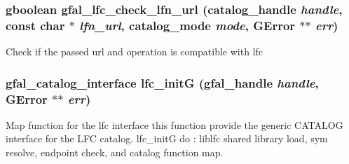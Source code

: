 \subsubsection{\setlength{\rightskip}{0pt plus 5cm}gboolean gfal\_\-lfc\_\-check\_\-lfn\_\-url (catalog\_\-handle {\em handle}, const char $\ast$ {\em lfn\_\-url}, catalog\_\-mode {\em mode}, GError $\ast$$\ast$ {\em err})}\label{gfal__common__lfc_8h_8baa624b528deb15ff4ee61fa9948ac8}


Check if the passed url and operation is compatible with lfc 
\subsubsection{\setlength{\rightskip}{0pt plus 5cm}gfal\_\-catalog\_\-interface lfc\_\-init\-G (gfal\_\-handle {\em handle}, GError $\ast$$\ast$ {\em err})}\label{gfal__common__lfc_8h_0d4af55002fa4216f9915b5a1a721ef4}


Map function for the lfc interface this function provide the generic CATALOG interface for the LFC catalog. lfc\_\-init\-G do : liblfc shared library load, sym resolve, endpoint check, and catalog function map. 